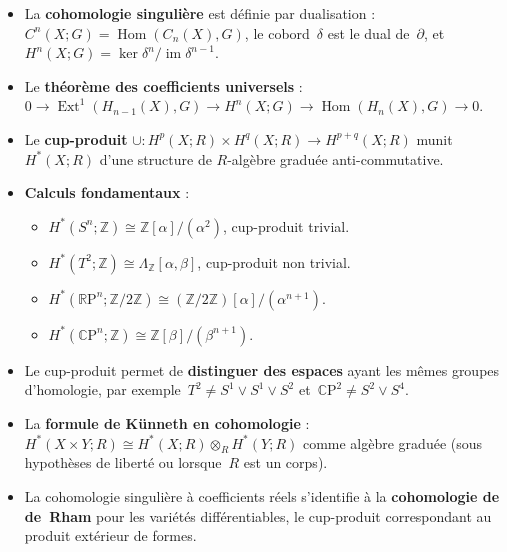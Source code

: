 \documentclass[12pt,a4paper,openany]{book}
\theoremstyle{definition}
\theoremstyle{plain}
\theoremstyle{remark}
\newcommand{\Z}{\mathbb{Z}}
\newcommand{\RP}{\mathbb{R}\mathrm{P}}
\newcommand{\CP}{\mathbb{C}\mathrm{P}}
\DeclareMathOperator{\Hom}{Hom}
\DeclareMathOperator{\im}{im}
\begin{document}
\begin{itemize}
  \item La \textbf{cohomologie singulière} est définie par dualisation :
    $C^n(X;G) = \Hom(C_n(X), G)$, le cobord~$\delta$ est le dual de~$\partial$,
    et~$H^n(X;G) = \ker\delta^n / \im\delta^{n-1}$.
  \item Le \textbf{théorème des coefficients universels} :
    $0 \to \operatorname{Ext}^1(H_{n-1}(X), G) \to H^n(X;G) \to \Hom(H_n(X), G) \to 0$.
  \item Le \textbf{cup-produit} $\cup \colon H^p(X;R) \times H^q(X;R) \to H^{p+q}(X;R)$
    munit~$H^*(X;R)$ d'une structure de $R$-algèbre graduée anti-commutative.
  \item \textbf{Calculs fondamentaux} :
    \begin{itemize}
      \item $H^*(S^n;\Z) \cong \Z[\alpha]/(\alpha^2)$, cup-produit trivial.
      \item $H^*(T^2;\Z) \cong \Lambda_\Z[\alpha,\beta]$, cup-produit non trivial.
      \item $H^*(\RP^n;\Z/2\Z) \cong (\Z/2\Z)[\alpha]/(\alpha^{n+1})$.
      \item $H^*(\CP^n;\Z) \cong \Z[\beta]/(\beta^{n+1})$.
    \end{itemize}
  \item Le cup-produit permet de \textbf{distinguer des espaces} ayant les mêmes groupes
    d'homologie, par exemple~$T^2 \neq S^1 \vee S^1 \vee S^2$ et~$\CP^2 \neq S^2 \vee S^4$.
  \item La \textbf{formule de Künneth en cohomologie} :
    $H^*(X \times Y; R) \cong H^*(X;R) \otimes_R H^*(Y;R)$ comme algèbre graduée
    (sous hypothèses de liberté ou lorsque~$R$ est un corps).
  \item La cohomologie singulière à coefficients réels s'identifie à la \textbf{cohomologie
    de de~Rham} pour les variétés différentiables, le cup-produit correspondant au produit
    extérieur de formes.
\end{itemize}


\end{document}
